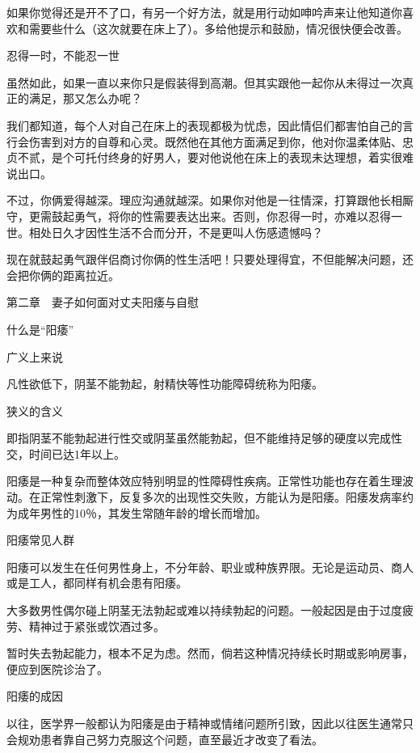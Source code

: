\documentclass[12pt,UTF8]{ctexbook}
\begin{document}
如果你觉得还是开不了口，有另一个好方法，就是用行动如呻吟声来让他知道你喜欢和需要些什么（这次就要在床上了）。多给他提示和鼓励，情况很快便会改善。

忍得一时，不能忍一世

虽然如此，如果一直以来你只是假装得到高潮。但其实跟他一起你从未得过一次真正的满足，那又怎么办呢？

我们都知道，每个人对自己在床上的表现都极为忧虑，因此情侣们都害怕自己的言行会伤害到对方的自尊和心灵。既然他在其他方面满足到你，他对你温柔体贴、忠贞不贰，是个可托付终身的好男人，要对他说他在床上的表现未达理想，着实很难说出口。

不过，你俩爱得越深。理应沟通就越深。如果你对他是一往情深，打算跟他长相厮守，更需鼓起勇气，将你的性需要表达出来。否则，你忍得一时，亦难以忍得一世。相处日久才因性生活不合而分开，不是更叫人伤感遗憾吗？

现在就鼓起勇气跟伴侣商讨你俩的性生活吧！只要处理得宜，不但能解决问题，还会把你俩的距离拉近。





第二章　妻子如何面对丈夫阳痿与自慰


什么是“阳痿”


广义上来说

凡性欲低下，阴茎不能勃起，射精快等性功能障碍统称为阳痿。

狭义的含义

即指阴茎不能勃起进行性交或阴茎虽然能勃起，但不能维持足够的硬度以完成性交，时间已达1年以上。

阳痿是一种复杂而整体效应特别明显的性障碍性疾病。正常性功能也存在着生理波动。在正常性刺激下，反复多次的出现性交失败，方能认为是阳痿。阳痿发病率约为成年男性的10％，其发生常随年龄的增长而增加。





阳痿常见人群


阳痿可以发生在任何男性身上，不分年龄、职业或种族界限。无论是运动员、商人或是工人，都同样有机会患有阳痿。

大多数男性偶尔碰上阴茎无法勃起或难以持续勃起的问题。一般起因是由于过度疲劳、精神过于紧张或饮酒过多。

暂时失去勃起能力，根本不足为虑。然而，倘若这种情况持续长时期或影响房事，便应到医院诊治了。





阳痿的成因


以往，医学界一般都认为阳痿是由于精神或情绪问题所引致，因此以往医生通常只会规劝患者靠自己努力克服这个问题，直至最近才改变了看法。
\end{document}
